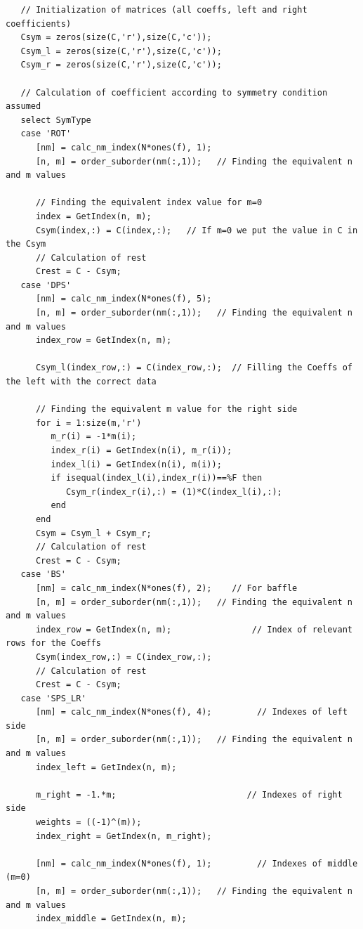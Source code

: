 \documentclass{report}
\begin{document}
\begin{appendices}
\begin{lstlisting}
   // Initialization of matrices (all coeffs, left and right coefficients)
   Csym = zeros(size(C,'r'),size(C,'c'));
   Csym_l = zeros(size(C,'r'),size(C,'c'));  
   Csym_r = zeros(size(C,'r'),size(C,'c'));
   
   // Calculation of coefficient according to symmetry condition assumed
   select SymType
   case 'ROT' 
      [nm] = calc_nm_index(N*ones(f), 1);                      
      [n, m] = order_suborder(nm(:,1));   // Finding the equivalent n and m values   
      
      // Finding the equivalent index value for m=0
      index = GetIndex(n, m);      
      Csym(index,:) = C(index,:);   // If m=0 we put the value in C in the Csym
      // Calculation of rest 
      Crest = C - Csym;
   case 'DPS'
      [nm] = calc_nm_index(N*ones(f), 5);                
      [n, m] = order_suborder(nm(:,1));   // Finding the equivalent n and m values
      index_row = GetIndex(n, m);

      Csym_l(index_row,:) = C(index_row,:);  // Filling the Coeffs of the left with the correct data
      
      // Finding the equivalent m value for the right side
      for i = 1:size(m,'r')
         m_r(i) = -1*m(i);
         index_r(i) = GetIndex(n(i), m_r(i));
         index_l(i) = GetIndex(n(i), m(i));
         if isequal(index_l(i),index_r(i))==%F then
            Csym_r(index_r(i),:) = (1)*C(index_l(i),:);
         end
      end
      Csym = Csym_l + Csym_r;
      // Calculation of rest 
      Crest = C - Csym;
   case 'BS'
      [nm] = calc_nm_index(N*ones(f), 2);    // For baffle
      [n, m] = order_suborder(nm(:,1));   // Finding the equivalent n and m values      
      index_row = GetIndex(n, m);                // Index of relevant rows for the Coeffs         
      Csym(index_row,:) = C(index_row,:);  
      // Calculation of rest 
      Crest = C - Csym;
   case 'SPS_LR'
      [nm] = calc_nm_index(N*ones(f), 4);         // Indexes of left side
      [n, m] = order_suborder(nm(:,1));   // Finding the equivalent n and m values
      index_left = GetIndex(n, m);
            
      m_right = -1.*m;                          // Indexes of right side
      weights = ((-1)^(m));
      index_right = GetIndex(n, m_right);
      
      [nm] = calc_nm_index(N*ones(f), 1);         // Indexes of middle (m=0)
      [n, m] = order_suborder(nm(:,1));   // Finding the equivalent n and m values
      index_middle = GetIndex(n, m);
      

\end{lstlisting}
\end{appendices}
\end{document}
